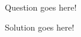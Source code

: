 \documentclass[../main.tex]{subfiles}
\begin{document}
\begin{question}
    Question goes here!
\end{question}

\begin{solution}
    Solution goes here!
\end{solution}
\end{document}

